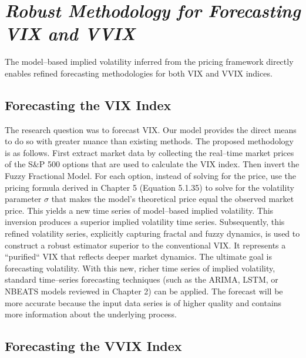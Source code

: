 \documentclass[12pt,a4paper]{report}
\numberwithin{equation}{section}
\begin{document}
\hypertarget{robust--methodology--for--forecasting--vix--and--vvix}{%
\section{\texorpdfstring{\emph{\textbf{Robust Methodology for
Forecasting VIX and
VVIX}}}{Robust Methodology for Forecasting VIX and VVIX}}\label{robust--methodology--for--forecasting--vix--and--vvix}}

The model--based implied volatility inferred from the pricing framework
directly enables refined forecasting methodologies for both VIX and VVIX
indices.

\hypertarget{forecasting--the--vix--index}{%
\subsection{Forecasting the VIX
Index}\label{forecasting--the--vix--index}}

The research question was to forecast VIX. Our model provides the direct
means to do so with greater nuance than existing methods. The proposed
methodology is as follows. First extract market data by collecting the
real--time market prices of the S\&P 500 options that are used to
calculate the VIX index. Then invert the Fuzzy Fractional Model. For
each option, instead of solving for the price, use the pricing formula
derived in Chapter 5 (Equation 5.1.35) to solve for the volatility
parameter \emph{$\sigma$} that makes the model's theoretical price equal the
observed market price. This yields a new time series of model--based
implied volatility. This inversion produces a superior implied
volatility time series. Subsequently, this refined volatility series,
explicitly capturing fractal and fuzzy dynamics, is used to construct a
robust estimator superior to the conventional VIX. It represents a
``purified`` VIX that reflects deeper market dynamics. The ultimate goal
is forecasting volatility. With this new, richer time series of implied
volatility, standard time--series forecasting techniques (such as the
ARIMA, LSTM, or NBEATS models reviewed in Chapter 2) can be applied. The
forecast will be more accurate because the input data series is of
higher quality and contains more information about the underlying
process.

\hypertarget{forecasting--the--vvix--index}{%
\subsection{Forecasting the VVIX
Index}\label{forecasting--the--vvix--index}}
\end{document}

